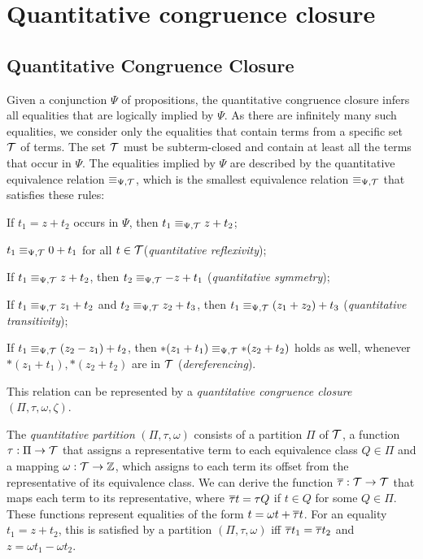 \section{Quantitative congruence closure}

\subsection{Quantitative Congruence Closure}\label{qcc}

Given a conjunction $\Psi$ of propositions, the quantitative congruence closure infers all equalities that are logically implied by $\Psi$.
As there are infinitely many such equalities, we consider only the equalities that contain terms from a specific set $\mathcal{T}$ of terms.
The set $\mathcal{T}$ must be subterm-closed and contain at least all the terms that occur in $\Psi$.
The equalities implied by $\Psi$ are described by the quantitative equivalence relation $\equiv_{\Psi,\mathcal{T}}$,
which is the smallest equivalence relation $\equiv_{\Psi,\mathcal{T}}$ that satisfies these rules:
\begin{enumerate}[label={[E\arabic*]}, ref={[E\arabic*]}]
  \setcounter{enumi}{-1}
\item\label{item:persistence} If $t_1 = z+t_2$ occurs in $\Psi$, then $t_1 \equiv_{\Psi,\mathcal{T}} z+t_2$;
\item\label{item:quantitative-reflexivity} $t_1 \equiv_{\Psi,\mathcal{T}} 0+t_1$ for all $t\in\mathcal{T}$(\emph{quantitative reflexivity});
\item\label{item:quantitative-symmetry} If $t_1 \equiv_{\Psi,\mathcal{T}} z+t_2$, then $t_2 \equiv_{\Psi,\mathcal{T}} -z+t_1$ (\emph{quantitative symmetry});
\item\label{item:quantitative-transitivity} If $t_1 \equiv_{\Psi,\mathcal{T}} z_1+t_2$ and $t_2 \equiv_{\Psi,\mathcal{T}} z_2 + t_3$,
		then $t_1 \equiv_{\Psi,\mathcal{T}} (z_1+z_2)+t_3$ (\emph{quantitative transitivity});
\item\label{item:dereferencing} If $t_1 \equiv_{\Psi,\mathcal{T}} (z_2 - z_1) + t_2$, then $*(z_1 + t_1) \equiv_{\Psi,\mathcal{T}} *(z_2 + t_2)$ holds as well, whenever $*(z_1 + t_1),  *(z_2 + t_2)$ are in $\mathcal{T}$ (\emph{dereferencing}).
\end{enumerate}

This relation can be represented by a \emph{quantitative congruence closure} $(\Pi, \tau, \omega, \zeta)$.

The \emph{quantitative partition} $(\Pi, \tau, \omega)$ consists of a partition $\Pi$ of $\mathcal{T}$, a function $\tau : \Pi \rightarrow \mathcal{T}$ that assigns a representative term to each equivalence class $Q \in \Pi$ and a mapping $\omega : \mathcal{T} \rightarrow \mathbb{Z}$, which assigns to each term its offset from the representative of its equivalence class.
We can derive the function $\overline{\tau} : \mathcal{T} \rightarrow \mathcal{T}$ that maps each term to its representative, where $\overline{\tau} t = \tau Q$ if $t \in Q$ for some $Q \in \Pi$.
These functions represent equalities of the form $t = \omega t + \overline{\tau} t$.
For an equality $t_1 = z + t_2$, this is satisfied by a partition $(\Pi, \tau, \omega)$ iff $\overline{\tau} t_1 = \overline{\tau} t_2$ and $z = \omega t_1 - \omega t_2$.

